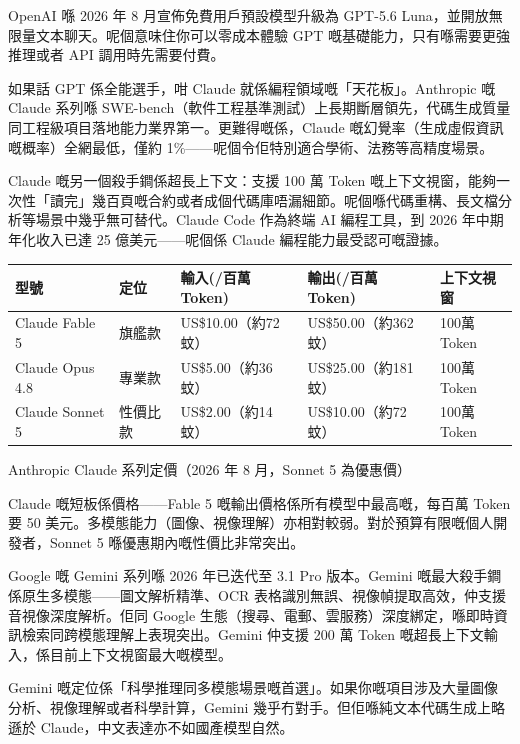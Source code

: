 OpenAI 喺 2026 年 8 月宣佈免費用戶預設模型升級為 GPT-5.6 Luna，並開放無限量文本聊天。呢個意味住你可以零成本體驗 GPT 嘅基礎能力，只有喺需要更強推理或者 API 調用時先需要付費。


如果話 GPT 係全能選手，咁 Claude 就係編程領域嘅「天花板」。Anthropic 嘅 Claude 系列喺 SWE-bench（軟件工程基準測試）上長期斷層領先，代碼生成質量同工程級項目落地能力業界第一。更難得嘅係，Claude 嘅幻覺率（生成虛假資訊嘅概率）全網最低，僅約 1\%——呢個令佢特別適合學術、法務等高精度場景。

Claude 嘅另一個殺手鐧係超長上下文：支援 100 萬 Token 嘅上下文視窗，能夠一次性「讀完」幾百頁嘅合約或者成個代碼庫唔漏細節。呢個喺代碼重構、長文檔分析等場景中幾乎無可替代。Claude Code 作為終端 AI 編程工具，到 2026 年中期年化收入已達 25 億美元——呢個係 Claude 編程能力最受認可嘅證據。

\begin{center}
\begin{tabularx}{\linewidth}{|X|X|X|X|X|}
\hline
\textbf{型號} & \textbf{定位} & \textbf{輸入(/百萬Token)} & \textbf{輸出(/百萬Token)} & \textbf{上下文視窗} \tabularnewline
\hline
Claude Fable 5 & 旗艦款 & US\$10.00（約72蚊） & US\$50.00（約362蚊） & 100萬Token \tabularnewline
Claude Opus 4.8 & 專業款 & US\$5.00（約36蚊） & US\$25.00（約181蚊） & 100萬Token \tabularnewline
Claude Sonnet 5 & 性價比款 & US\$2.00（約14蚊） & US\$10.00（約72蚊） & 100萬Token \tabularnewline
\hline
\end{tabularx}
\end{center}

\begin{center}\small\color{gray}Anthropic Claude 系列定價（2026 年 8 月，Sonnet 5 為優惠價）\end{center}

Claude 嘅短板係價格——Fable 5 嘅輸出價格係所有模型中最高嘅，每百萬 Token 要 50 美元。多模態能力（圖像、視像理解）亦相對較弱。對於預算有限嘅個人開發者，Sonnet 5 喺優惠期內嘅性價比非常突出。


Google 嘅 Gemini 系列喺 2026 年已迭代至 3.1 Pro 版本。Gemini 嘅最大殺手鐧係原生多模態——圖文解析精準、OCR 表格識別無誤、視像幀提取高效，仲支援音視像深度解析。佢同 Google 生態（搜尋、電郵、雲服務）深度綁定，喺即時資訊檢索同跨模態理解上表現突出。Gemini 仲支援 200 萬 Token 嘅超長上下文輸入，係目前上下文視窗最大嘅模型。

Gemini 嘅定位係「科學推理同多模態場景嘅首選」。如果你嘅項目涉及大量圖像分析、視像理解或者科學計算，Gemini 幾乎冇對手。但佢喺純文本代碼生成上略遜於 Claude，中文表達亦不如國產模型自然。

